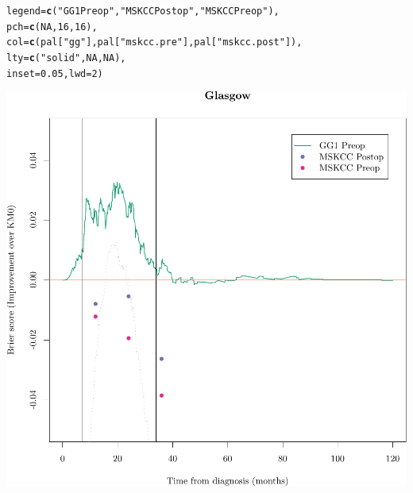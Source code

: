 \documentclass{article}\usepackage[]{graphicx}\usepackage[]{color}
\makeatletter
\def\maxwidth{ %
  \ifdim\Gin@nat@width>\linewidth
    \linewidth
  \else
    \Gin@nat@width
  \fi
}
\newcommand{\hlnum}[1]{\textcolor[rgb]{0.686,0.059,0.569}{#1}}%
\newcommand{\hlstr}[1]{\textcolor[rgb]{0.192,0.494,0.8}{#1}}%
\newcommand{\hlstd}[1]{\textcolor[rgb]{0.345,0.345,0.345}{#1}}%
\newcommand{\hlkwc}[1]{\textcolor[rgb]{0.333,0.667,0.333}{#1}}%
\newcommand{\hlkwd}[1]{\textcolor[rgb]{0.737,0.353,0.396}{\textbf{#1}}}%
\newenvironment{kframe}{%
 \def\at@end@of@kframe{}%
 \ifinner\ifhmode%
  \def\at@end@of@kframe{\end{minipage}}%
  \begin{minipage}{\columnwidth}%
 \fi\fi%
 \def\FrameCommand##1{\hskip\@totalleftmargin \hskip-\fboxsep
 \colorbox{shadecolor}{##1}\hskip-\fboxsep
     \hskip-\linewidth \hskip-\@totalleftmargin \hskip\columnwidth}%
 \MakeFramed {\advance\hsize-\width
   \@totalleftmargin\z@ \linewidth\hsize
   \@setminipage}}%
 {\par\unskip\endMakeFramed%
 \at@end@of@kframe}
\newenvironment{knitrout}{}{} %
\makeatother
\begin{document}
\begin{knitrout}
\begin{kframe}
\begin{alltt}
        \hlkwc{legend} \hlstd{=} \hlkwd{c}\hlstd{(}     \hlstr{"GG1 Preop"}\hlstd{,}    \hlstr{"MSKCC Postop"}\hlstd{,}         \hlstr{"MSKCC Preop"}\hlstd{),}
        \hlkwc{pch} \hlstd{=} \hlkwd{c}\hlstd{(}        \hlnum{NA}\hlstd{,}                     \hlnum{16}\hlstd{,}                             \hlnum{16}\hlstd{),}
        \hlkwc{col} \hlstd{=} \hlkwd{c}\hlstd{(        pal[}\hlstr{"gg"}\hlstd{],              pal[}\hlstr{"mskcc.pre"}\hlstd{],       pal[}\hlstr{"mskcc.post"}\hlstd{]),}
        \hlkwc{lty} \hlstd{=} \hlkwd{c}\hlstd{(}        \hlstr{"solid"}\hlstd{,}                \hlnum{NA}\hlstd{,}                             \hlnum{NA}\hlstd{),}
        \hlkwc{inset} \hlstd{=} \hlnum{0.05}\hlstd{,} \hlkwc{lwd} \hlstd{=} \hlnum{2}\hlstd{)}
\end{alltt}
\end{kframe}

{\centering \includegraphics[width=\maxwidth]{figure/07-prob-bs-paths-plot-glasgow-3} 

}



\end{knitrout}
\end{document}

